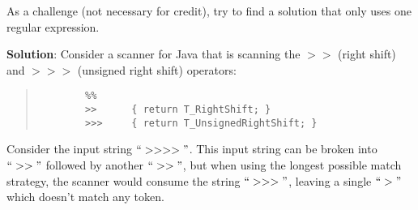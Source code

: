 \documentclass[11pt]{article}
\begin{document}
\begin{enumerate}
As a challenge (not necessary for credit), try to find a solution that only uses one regular expression.

\textbf{Solution}: Consider a scanner for Java that is scanning the $\mathtt{>>}$ (right shift) and $\mathtt{>>>}$ (unsigned right shift) operators:
    \begin{quote}
        \begin{lstlisting}
        %%
        >>      { return T_RightShift; }
        >>>     { return T_UnsignedRightShift; }
        \end{lstlisting}
    \end{quote}

    Consider the input string $``>>>>"$. This input string can be broken into $``>>"$ followed by another $``>>"$, but when
    using the longest possible match strategy, the scanner would consume the string $``>>>"$, leaving a single $``>"$ which doesn't match any token.

\end{enumerate}
\end{document}
